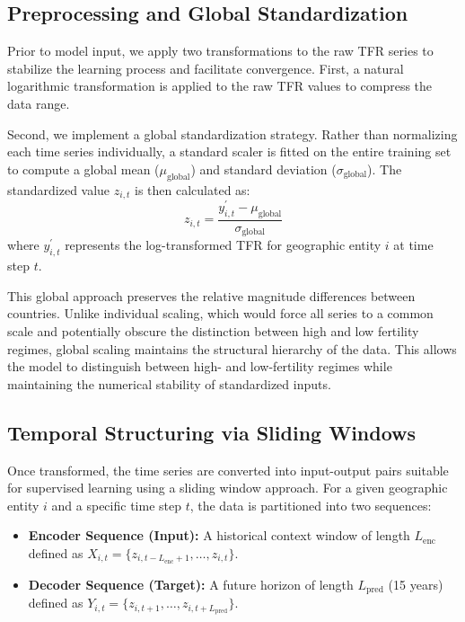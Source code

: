 \documentclass[12pt]{article}
\begin{document}
\subsection{Preprocessing and Global Standardization}

Prior to model input, we apply two transformations to the raw TFR series to stabilize the learning process and facilitate convergence. First, a natural logarithmic transformation is applied to the raw TFR values to compress the data range. 

Second, we implement a global standardization strategy. Rather than normalizing each time series individually, a standard scaler is fitted on the entire training set to compute a global mean ($\mu_{\text{global}}$) and standard deviation ($\sigma_{\text{global}}$). The standardized value $z_{i,t}$ is then calculated as:
\begin{equation}
    z_{i,t} = \frac{y_{i,t}^{\prime} - \mu_{\text{global}}}{\sigma_{\text{global}}}
\end{equation}
where $y_{i,t}^{\prime}$ represents the log-transformed TFR for geographic entity $i$ at time step $t$.

This global approach preserves the relative magnitude differences between countries. Unlike individual scaling, which would force all series to a common scale and potentially obscure the distinction between high and low fertility regimes, global scaling maintains the structural hierarchy of the data. This allows the model to distinguish between high- and low-fertility regimes while maintaining the numerical stability of standardized inputs.

\subsection{Temporal Structuring via Sliding Windows}

Once transformed, the time series are converted into input-output pairs suitable for supervised learning using a sliding window approach. For a given geographic entity $i$ and a specific time step $t$, the data is partitioned into two sequences:
\begin{itemize}
    \item \textbf{Encoder Sequence (Input):} A historical context window of length $L_{\text{enc}}$ defined as $X_{i,t} = \{z_{i,t-L_{\text{enc}}+1}, \dots, z_{i,t}\}$.
    \item \textbf{Decoder Sequence (Target):} A future horizon of length $L_{\text{pred}}$ (15 years) defined as $Y_{i,t} = \{z_{i,t+1}, \dots, z_{i,t+L_{\text{pred}}}\}$.
\end{itemize}
\end{document}
